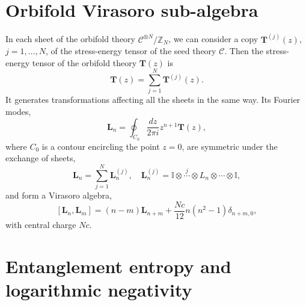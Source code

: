 \documentclass[a4paper,11pt]{article}
\begin{document}
\section{Orbifold Virasoro sub-algebra}\label{app_orbifold_algebra}

In each sheet of the orbifold theory $\mathcal{C}^{\otimes N}/\mathbb{Z}_N$, we 
can consider a copy $\boldsymbol{T}^{(j)}(z)$, $j=1,\dots, N$, of the stress-energy tensor of 
the seed theory $\mathcal{C}$. Then the stress-energy tensor of the 
orbifold theory $\boldsymbol{T}(z)$ is 
\begin{equation}\label{hatT}
 \boldsymbol{T}(z)=\sum_{j=1}^N \boldsymbol{T}^{(j)}(z).
\end{equation}
It generates transformations affecting all the sheets in the same way. 
Its Fourier modes,
\begin{equation}
 \boldsymbol{L}_n=\oint_{C_0}\frac{dz}{2\pi i} z^{n+1}\boldsymbol{T}(z),
\end{equation}
where $C_0$ is a contour encircling the point $z=0$, are symmetric 
under the exchange of sheets, 
\begin{equation}
 \boldsymbol{L}_n=\sum_{j=1}^N \boldsymbol{L}_n^{(j)}, \quad 
 \boldsymbol{L}_n^{(j)}=\mathbb{I}\otimes \overset{j}{\cdots} \otimes L_{n}\otimes \cdots \otimes \mathbb{I},
\end{equation}
and form a Virasoro algebra, 
\begin{equation}\label{symm_virasoro_alg}
 [\boldsymbol{L}_n, \boldsymbol{L}_{m}]=(n-m)\boldsymbol{L}_{n+m}+\frac{Nc}{12}n(n^2-1)\delta_{n+m, 0},
\end{equation}
with central charge $Nc$.

\section{Entanglement entropy and logarithmic negativity}\label{app_ent}
\end{document}
